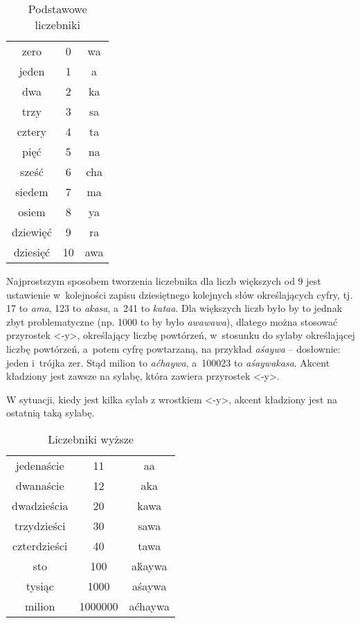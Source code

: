 \begin{spacing}{1.1}
\begin{table}[h]
	\centering
	\caption{Podstawowe liczebniki}
	\begin{tabular}{ccc} \toprule
		zero & 0 & wa \\
		jeden & 1 & a \\
		dwa & 2 & ka \\
		trzy & 3 & sa \\
		cztery & 4 & ta \\
		pięć & 5 & na \\
		sześć & 6 & cha \\
		siedem & 7 & ma \\
		osiem & 8 & ya \\
		dziewięć & 9 & ra \\
		dziesięć & 10 & awa \\\bottomrule
	\end{tabular}
	\label{tab:chars}
\end{table}

Najprostszym sposobem tworzenia liczebnika dla liczb większych od 9 jest 
ustawienie w~kolejności zapisu dziesiętnego kolejnych słów określających cyfry,
tj. 17 to \emph{ama}, 123 to \emph{akasa}, a~241 to \emph{kataa}. Dla większych
liczb było by to jednak zbyt problematyczne (np. 1000 to by było 
\emph{awawawa}), dlatego można stosować przyrostek <-y>, określający liczbę 
powtórzeń, w~stosunku do sylaby określającej liczbę powtórzeń, a~potem cyfrę 
powtarzaną, na przykład \emph{aśaywa} -- dosłownie: jeden i~trójka zer. Stąd 
milion to \emph{aćhaywa}, a~100023 to \emph{aśaywakasa}. Akcent kładziony jest 
zawsze na sylabę, która zawiera przyrostek <-y>.

W sytuacji, kiedy jest kilka sylab z wrostkiem <-y>, akcent kładziony jest na
ostatnią taką sylabę.

\begin{table}[h]
	\centering
	\caption{Liczebniki wyższe}
	\begin{tabular}{ccc} \toprule
		jedenaście & 11 & aa \\
		dwanaście & 12 & aka \\
		dwadzieścia & 20 & kawa \\
		trzydzieści & 30 & sawa \\
		czterdzieści & 40 & tawa \\
		sto & 100 & aḱaywa  \\
		tysiąc & 1000 & aśaywa \\
		milion & 1000000 & aćhaywa \\\bottomrule
	\end{tabular}
	\label{tab:chars}
\end{table}


\end{spacing}
